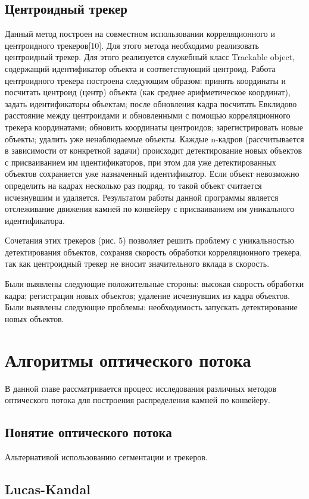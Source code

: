 \documentclass[specification,annotation,times]{itmo-student-thesis}
\begin{document}
\section{Центроидный трекер}
Данный метод построен на совместном использовании корреляционного и центроидного трекеров[10].
Для этого метода необходимо реализовать центроидный трекер. Для этого реализуется служебный класс Trackable object, содержащий идентификатор объекта и соответствующий центроид.
Работа центроидного трекера построена следующим образом:
принять координаты и посчитать центроид (центр) объекта (как среднее арифметическое координат), задать идентификаторы объектам;
после обновления кадра посчитать Евклидово расстояние между центроидами и обновленными с помощью  корреляционного трекера координатами;
обновить координаты центроидов;
зарегистрировать новые объекты;
удалить уже ненаблюдаемые объекты.
Каждые n-кадров (рассчитывается в зависимости от конкретной задачи) происходит детектирование новых объектов с присваиванием им идентификаторов, при этом для уже детектированных объектов сохраняется уже назначенный идентификатор.  Если объект невозможно определить на кадрах несколько раз подряд, то такой объект считается исчезнувшим и удаляется.
Результатом работы данной программы является отслеживание движения камней по конвейеру с присваиванием им уникального идентификатора.

Сочетания этих трекеров (рис. 5)  позволяет решить проблему с уникальностью детектирования объектов, сохраняя скорость обработки корреляционного трекера, так как центроидный трекер не вносит значительного вклада в скорость.


Были выявлены следующие положительные стороны:
высокая скорость обработки кадра;
регистрация новых объектов;
удаление исчезнувших из кадра объектов.
Были выявлены следующие проблемы:
необходимость запускать детектирование новых объектов.

\chapter{Алгоритмы оптического потока}
В данной главе рассматривается процесс исследования различных методов оптического потока для построения распределения камней по конвейеру.
\section{Понятие оптического потока}
Альтернативой использованию сегментации и трекеров. 
\section{Lucas-Kandal}
\end{document}
